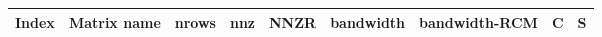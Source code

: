 \begin{tabular}{|l|l|r|r|S[round-mode=places,round-precision=2]|r|r|r|c|}
\toprule
{Index} & {Matrix name} &  {\acrshort{nrows}} & {\acrshort{nnz}} & {\acrshort{NNZR}}  & {bandwidth} & {bandwidth-RCM} & {C} & {S}  \\
\midrule
\bottomrule
\end{tabular}


